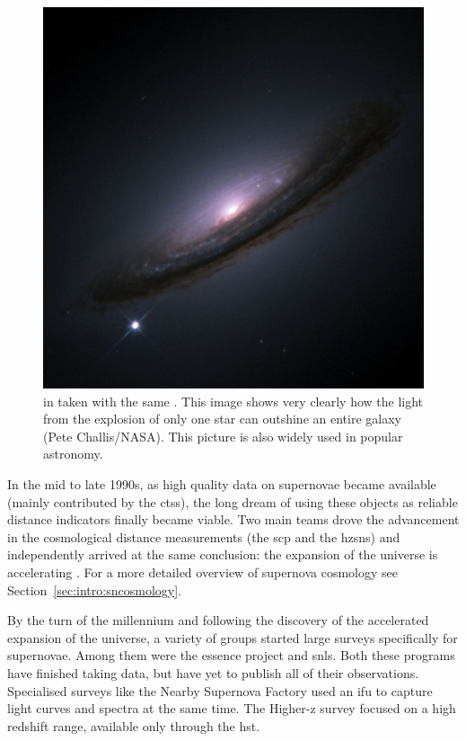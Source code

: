 \begin{figure}[tb] %
   \centering
   \includegraphics[width=\textwidth, trim=4cm 4cm 4cm 10cm, clip=true, keepaspectratio]{chapter_intro/plots/sn1994d.jpg} 
   \caption[HST image of SN 1994D]{ in  taken with the same . This image shows very clearly how the light from the explosion of only one star can outshine an entire galaxy (Pete Challis/NASA). This picture is also widely used in popular astronomy.}
   \label{fig:sn1994d}
\end{figure}

In the mid to late 1990s, as high quality data on supernovae became available (mainly contributed by the \gls{ctss}), the long dream \citep[e.g.][]{1938ApJ....88..285B, 1960ZA.....49..201V, 1968AJ.....73.1021K} of using these objects as reliable distance indicators finally became viable. Two main teams drove the advancement in the cosmological distance measurements (the \gls{scp} and the \gls{hzsns}) and independently arrived at the same conclusion: the expansion of the universe is accelerating \citep{1998AJ....116.1009R,1999ApJ...517..565P}. For a more detailed overview of supernova cosmology see Section~\ref{sec:intro:sncosmology}.

By the turn of the millennium and following the discovery of the accelerated expansion of the universe, a variety of groups started large surveys specifically for supernovae. Among them were the \gls{essence} project and \gls{snls}. Both these programs have finished taking data, but have yet to publish all of their observations. Specialised surveys like the Nearby Supernova Factory \citep{2002SPIE.4836...61A} used an \gls{ifu} to capture light curves and spectra at the same time. The Higher-z survey \citep{2004ApJ...613..200S} focused on a high redshift range, available only through the \gls{hst}.

